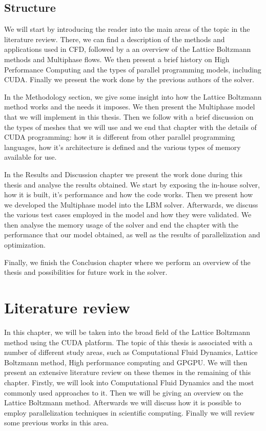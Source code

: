 \documentclass[12pt, openany]{book}
\begin{document}
\section{Structure}
We will start by introducing the reader into the main areas of the topic in the literature review. There, we can find a description of the methods and applications used in CFD, followed by a an overview of the Lattice Boltzmann methods and Multiphase flows. We then present a brief history on High Performance Computing and the types of parallel programming models, including CUDA. Finally we present the work done by the previous authors of the solver.\par
In the Methodology section, we give some insight into how the Lattice Boltzmann method works and the needs it imposes. We then present the Multiphase model that we will implement in this thesis. Then we follow with a brief discussion on the types of meshes that we will use and we end that chapter with the details of CUDA programming: how it is different from other parallel programming languages, how it's architecture is defined and the various types of memory available for use.\par
In the Results and Discussion chapter we present the work done during this thesis and analyse the results obtained. We start by exposing the in-house solver, how it is built, it's performance and how the code works. Then we present how we developed the Multiphase model into the LBM solver. Afterwards, we discuss the various test cases employed in the model and how they were validated. We then analyse the memory usage of the solver and end the chapter with the performance that our model obtained, as well as the results of parallelization and optimization.\par
Finally, we finish the Conclusion chapter where we perform an overview of the thesis and possibilities for future work in the solver.
\chapter{Literature review}
In this chapter, we will be taken into the broad field of the Lattice Boltzmann method using the CUDA platform. The topic of this thesis is associated with a number of different study areas, such as Computational Fluid Dynamics, Lattice Boltzmann method, High performance computing and GPGPU. We will then present an extensive literature review on these themes in the remaining of this chapter. Firstly, we will look into Computational Fluid Dynamics and the most commonly used approaches to it. Then we will be giving an overview on the Lattice Boltzmann method. Afterwards we will discuss how it is possible to employ parallelization techniques in scientific computing. Finally we will review some previous works in this area.
\end{document}
